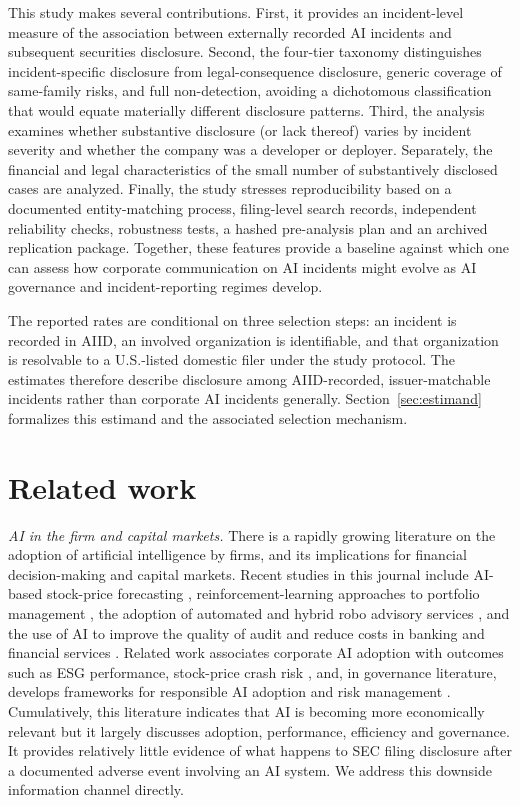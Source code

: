 \documentclass[utf8]{FrontiersinHarvard}
\begin{document}
This study makes several contributions. First, it provides an incident-level measure of the association between externally recorded AI incidents and subsequent securities disclosure. Second, the four-tier taxonomy distinguishes incident-specific disclosure from legal-consequence disclosure, generic coverage of same-family risks, and full non-detection, avoiding a dichotomous classification that would equate materially different disclosure patterns. Third, the analysis examines whether substantive disclosure (or lack thereof) varies by incident severity and whether the company was a developer or deployer. Separately, the financial and legal characteristics of the small number of substantively disclosed cases are analyzed. Finally, the study stresses reproducibility based on a documented entity-matching process, filing-level search records, independent reliability checks, robustness tests, a hashed pre-analysis plan and an archived replication package. Together, these features provide a baseline against which one can assess how corporate communication on AI incidents might evolve as AI governance and incident-reporting regimes develop.

The reported rates are conditional on three selection steps: an incident is recorded in AIID, an involved organization is identifiable, and that organization is resolvable to a U.S.-listed domestic filer under the study protocol. The estimates therefore describe disclosure among AIID-recorded, issuer-matchable incidents rather than corporate AI incidents generally. Section~\ref{sec:estimand} formalizes this estimand and the associated selection mechanism.

\section{Related work}

\textit{AI in the firm and capital markets.} There is a rapidly growing literature on the adoption of artificial intelligence by firms, and its implications for financial decision-making and capital markets. Recent studies in this journal include AI-based stock-price forecasting \citep{Rohan2026}, reinforcement-learning approaches to portfolio management \citep{YangPortfolio2026}, the adoption of automated and hybrid robo advisory services \citep{Verma2026}, and the use of AI to improve the quality of audit and reduce costs in banking and financial services \citep{Johri2026}. Related work associates corporate AI adoption with outcomes such as ESG performance, stock-price crash risk \citep{Shen2025,YangCrash2026}, and, in governance literature, develops frameworks for responsible AI adoption and risk management \citep{Madanchian2025}. Cumulatively, this literature indicates that AI is becoming more economically relevant but it largely discusses adoption, performance, efficiency and governance. It provides relatively little evidence of what happens to SEC filing disclosure after a documented adverse event involving an AI system. We address this downside information channel directly.
\end{document}
